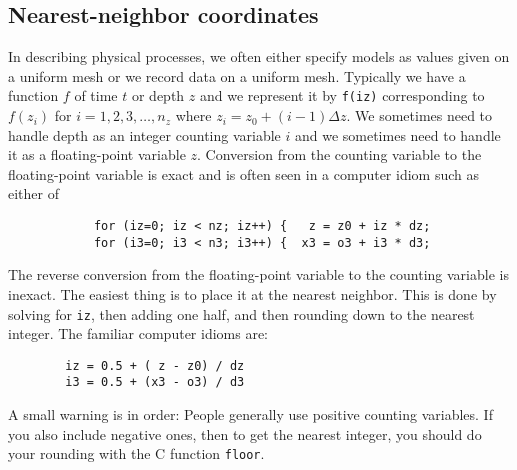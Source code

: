 \subsection{Nearest-neighbor coordinates}
In describing physical processes,
we often either specify models as values given on a uniform mesh
or we record data on a uniform mesh.
Typically we have
a function $f$ of time $t$ or depth $z$
and we represent it by {\tt f(iz)}
corresponding to $f(z_i)$ for $i=1,2,3,\ldots, n_z$
where $z_i = z_0+ (i-1)\Delta z$.
We sometimes need to handle depth as
an integer counting variable $i$
and we sometimes need to handle it as
a floating-point variable $z$.
Conversion from the counting variable to the floating-point variable
is exact and is often seen in a computer idiom
such as either of \begin{verbatim}
            for (iz=0; iz < nz; iz++) {   z = z0 + iz * dz; 
            for (i3=0; i3 < n3; i3++) {  x3 = o3 + i3 * d3;
\end{verbatim}
The reverse conversion from the floating-point variable
to the counting variable is inexact.
The easiest thing is to place it at the nearest neighbor.
This is done by solving for {\tt iz}, then adding one half,
and then rounding down to the nearest integer.
The familiar computer idioms are:\begin{verbatim}
        iz = 0.5 + ( z - z0) / dz
        i3 = 0.5 + (x3 - o3) / d3
\end{verbatim}
A small warning is in order:
People generally use positive counting variables.
If you also include negative ones,
then to get the nearest integer,
you should do your rounding with the 
C function \texttt{floor}.

